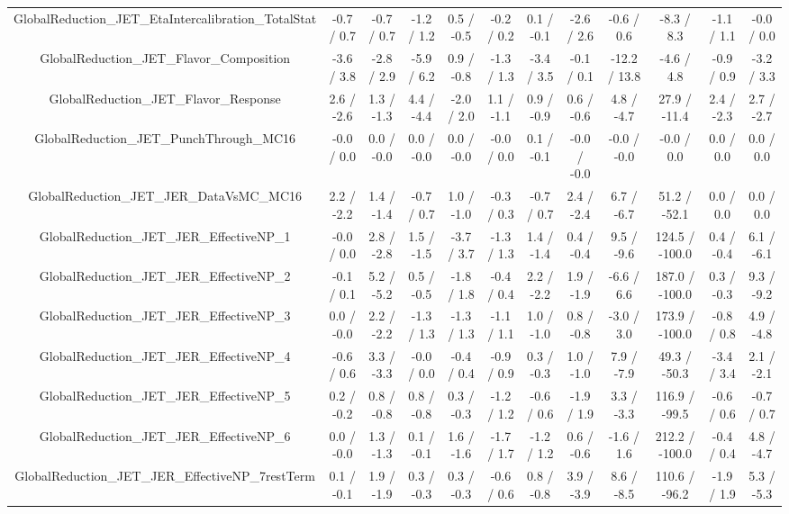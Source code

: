 \begin{table}[htbp]
\begin{center}
\begin{tabular}{|c|c|c|c|c|c|c|c|c|c|c|c|}
  GlobalReduction_JET_EtaIntercalibration_TotalStat & -0.7 / 0.7 & -0.7 / 0.7 & -1.2 / 1.2 & 0.5 / -0.5 & -0.2 / 0.2 & 0.1 / -0.1 & -2.6 / 2.6 & -0.6 / 0.6 & -8.3 / 8.3 & -1.1 / 1.1 & -0.0 / 0.0 \\ 
  GlobalReduction_JET_Flavor_Composition & -3.6 / 3.8 & -2.8 / 2.9 & -5.9 / 6.2 & 0.9 / -0.8 & -1.3 / 1.3 & -3.4 / 3.5 & -0.1 / 0.1 & -12.2 / 13.8 & -4.6 / 4.8 & -0.9 / 0.9 & -3.2 / 3.3 \\ 
  GlobalReduction_JET_Flavor_Response & 2.6 / -2.6 & 1.3 / -1.3 & 4.4 / -4.4 & -2.0 / 2.0 & 1.1 / -1.1 & 0.9 / -0.9 & 0.6 / -0.6 & 4.8 / -4.7 & 27.9 / -11.4 & 2.4 / -2.3 & 2.7 / -2.7 \\ 
  GlobalReduction_JET_PunchThrough_MC16 & -0.0 / 0.0 & 0.0 / -0.0 & 0.0 / -0.0 & 0.0 / -0.0 & -0.0 / 0.0 & 0.1 / -0.1 & -0.0 / -0.0 & -0.0 / -0.0 & -0.0 / 0.0 & 0.0 / 0.0 & 0.0 / 0.0 \\ 
  GlobalReduction_JET_JER_DataVsMC_MC16 & 2.2 / -2.2 & 1.4 / -1.4 & -0.7 / 0.7 & 1.0 / -1.0 & -0.3 / 0.3 & -0.7 / 0.7 & 2.4 / -2.4 & 6.7 / -6.7 & 51.2 / -52.1 & 0.0 / 0.0 & 0.0 / 0.0 \\ 
  GlobalReduction_JET_JER_EffectiveNP_1 & -0.0 / 0.0 & 2.8 / -2.8 & 1.5 / -1.5 & -3.7 / 3.7 & -1.3 / 1.3 & 1.4 / -1.4 & 0.4 / -0.4 & 9.5 / -9.6 & 124.5 / -100.0 & 0.4 / -0.4 & 6.1 / -6.1 \\ 
  GlobalReduction_JET_JER_EffectiveNP_2 & -0.1 / 0.1 & 5.2 / -5.2 & 0.5 / -0.5 & -1.8 / 1.8 & -0.4 / 0.4 & 2.2 / -2.2 & 1.9 / -1.9 & -6.6 / 6.6 & 187.0 / -100.0 & 0.3 / -0.3 & 9.3 / -9.2 \\ 
  GlobalReduction_JET_JER_EffectiveNP_3 & 0.0 / -0.0 & 2.2 / -2.2 & -1.3 / 1.3 & -1.3 / 1.3 & -1.1 / 1.1 & 1.0 / -1.0 & 0.8 / -0.8 & -3.0 / 3.0 & 173.9 / -100.0 & -0.8 / 0.8 & 4.9 / -4.8 \\ 
  GlobalReduction_JET_JER_EffectiveNP_4 & -0.6 / 0.6 & 3.3 / -3.3 & -0.0 / 0.0 & -0.4 / 0.4 & -0.9 / 0.9 & 0.3 / -0.3 & 1.0 / -1.0 & 7.9 / -7.9 & 49.3 / -50.3 & -3.4 / 3.4 & 2.1 / -2.1 \\ 
  GlobalReduction_JET_JER_EffectiveNP_5 & 0.2 / -0.2 & 0.8 / -0.8 & 0.8 / -0.8 & 0.3 / -0.3 & -1.2 / 1.2 & -0.6 / 0.6 & -1.9 / 1.9 & 3.3 / -3.3 & 116.9 / -99.5 & -0.6 / 0.6 & -0.7 / 0.7 \\ 
  GlobalReduction_JET_JER_EffectiveNP_6 & 0.0 / -0.0 & 1.3 / -1.3 & 0.1 / -0.1 & 1.6 / -1.6 & -1.7 / 1.7 & -1.2 / 1.2 & 0.6 / -0.6 & -1.6 / 1.6 & 212.2 / -100.0 & -0.4 / 0.4 & 4.8 / -4.7 \\ 
  GlobalReduction_JET_JER_EffectiveNP_7restTerm & 0.1 / -0.1 & 1.9 / -1.9 & 0.3 / -0.3 & 0.3 / -0.3 & -0.6 / 0.6 & 0.8 / -0.8 & 3.9 / -3.9 & 8.6 / -8.5 & 110.6 / -96.2 & -1.9 / 1.9 & 5.3 / -5.3 \\ 

\end{tabular}
\end{center}
\end{table}
